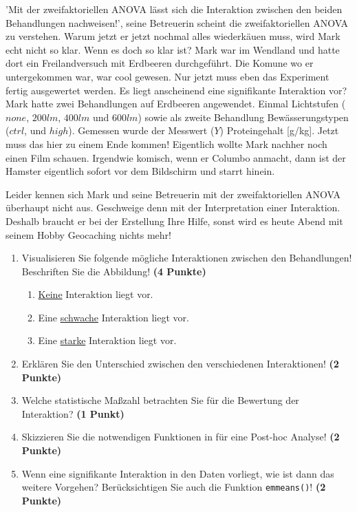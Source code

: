 \documentclass[a4paper, 9pt]{scrartcl}\usepackage[]{graphicx}\usepackage[]{xcolor}
\begin{document}
'Mit der zweifaktoriellen ANOVA lässt sich die Interaktion zwischen den beiden Behandlungen nachweisen!', seine Betreuerin scheint die zweifaktoriellen ANOVA zu verstehen. Warum jetzt er jetzt nochmal alles wiederkäuen muss, wird Mark echt nicht so klar. Wenn es doch so klar ist? Mark war im Wendland und hatte dort ein Freilandversuch mit Erdbeeren durchgeführt. Die Komune wo er untergekommen war, war cool gewesen. Nur jetzt muss eben das Experiment fertig ausgewertet werden. Es liegt anscheinend eine signifikante Interaktion vor? Mark hatte zwei Behandlungen auf Erdbeeren angewendet. Einmal Lichtstufen ($none$, $200lm$, $400lm$ und $600lm$) sowie als zweite Behandlung Bewässerungstypen ($ctrl$, und $high$). Gemessen wurde der Messwert ($Y$) Proteingehalt [g/kg]. Jetzt muss das hier zu einem Ende kommen! Eigentlich wollte Mark nachher noch einen Film schauen. Irgendwie komisch, wenn er Columbo anmacht, dann ist der Hamster eigentlich sofort vor dem Bildschirm und starrt hinein.

\vspace{1ex}

Leider kennen sich Mark und seine Betreuerin mit der zweifaktoriellen ANOVA überhaupt nicht aus. Geschweige denn mit der Interpretation einer Interaktion. Deshalb braucht er bei der Erstellung Ihre Hilfe, sonst wird es heute Abend mit seinem Hobby Geocaching nichts mehr! 

\begin{enumerate}
\item Visualisieren Sie folgende mögliche Interaktionen zwischen den Behandlungen! Beschriften Sie die Abbildung! \textbf{(4 Punkte)}
\begin{enumerate}
\item \underline{Keine} Interaktion liegt vor.
\item Eine \underline{schwache} Interaktion liegt vor. 
\item Eine \underline{starke} Interaktion liegt vor. 
\end{enumerate}
\item Erklären Sie den Unterschied zwischen den verschiedenen Interaktionen! \textbf{(2 Punkte)}
\item Welche statistische Maßzahl betrachten Sie für die Bewertung der Interaktion? \textbf{(1 Punkt)}
\item Skizzieren Sie die notwendigen Funktionen in \Rlogo für eine Post-hoc Analyse! \textbf{(2 Punkte)} 
\item Wenn eine signifikante Interaktion in den Daten vorliegt, wie ist dann das weitere Vorgehen? Berücksichtigen Sie auch die Funktion \texttt{emmeans()}! \textbf{(2 Punkte)}
\end{enumerate}
\end{document}
